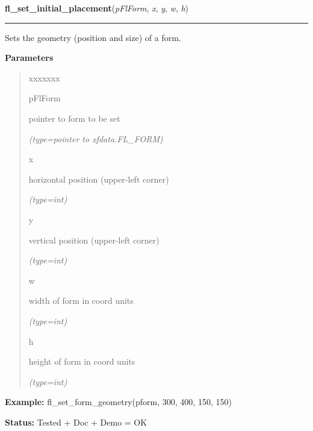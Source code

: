     \label{xformslib:flbasic:fl_set_form_geometry}

    \vspace{0.5ex}

\hspace{.8\funcindent}\begin{boxedminipage}{\funcwidth}

    \raggedright \textbf{fl\_set\_initial\_placement}(\textit{pFlForm}, \textit{x}, \textit{y}, \textit{w}, \textit{h})

    \vspace{-1.5ex}

    \rule{\textwidth}{0.5\fboxrule}
\setlength{\parskip}{2ex}
    Sets the geometry (position and size) of a form.

\setlength{\parskip}{1ex}
      \textbf{Parameters}
      \vspace{-1ex}

      \begin{quote}
        \begin{Ventry}{xxxxxxx}

          \item[pFlForm]

          pointer to form to be set

            {\it (type=pointer to xfdata.FL\_FORM)}

          \item[x]

          horizontal position (upper-left corner)

            {\it (type=int)}

          \item[y]

          vertical position (upper-left corner)

            {\it (type=int)}

          \item[w]

          width of form in coord units

            {\it (type=int)}

          \item[h]

          height of form in coord units

            {\it (type=int)}

        \end{Ventry}

      \end{quote}

\textbf{Example:} fl\_set\_form\_geometry(pform, 300, 400, 150, 150)



\textbf{Status:} Tested + Doc + Demo = OK



    \end{boxedminipage}

